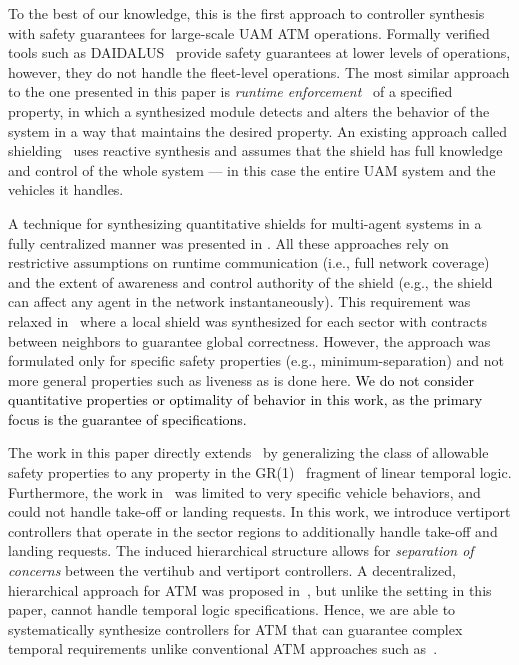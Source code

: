 To the best of our knowledge, this is the first approach to
controller synthesis with safety guarantees for large-scale UAM ATM operations. Formally verified tools such as DAIDALUS~\cite{Daidalus} provide safety guarantees at lower levels of operations, however, they do not handle the fleet-level operations. The most similar approach to the one presented in this paper is \emph{runtime enforcement}~\cite{Falcone10,Schneider00} of a specified property, in which a synthesized module detects and alters the behavior of the system in a way that maintains the desired property. An existing approach called shielding~\cite{BloemKKW15,KonighoferABHKT17} uses reactive synthesis and assumes that the shield has full knowledge and control of the whole system --- in this case the entire UAM system and the vehicles it handles. 

A technique for synthesizing quantitative shields for multi-agent systems in a fully centralized manner was presented in \cite{multiagentshield}. All these approaches rely on restrictive assumptions on runtime communication (i.e., full network coverage) and the extent of awareness and control authority of the shield (e.g., the shield can affect any agent in the network instantaneously). This requirement was relaxed in~\cite{bhnfm} where a local shield was synthesized for each sector with contracts between neighbors to guarantee global correctness. However, the approach was formulated only for specific safety properties (e.g., minimum-separation) and not more general properties such as liveness as is done here. \textcolor{black}{We do not consider quantitative properties or optimality of behavior in this work, as the primary focus is the guarantee of specifications.}

The work in this paper directly extends~\cite{bhnfm} by generalizing the class of allowable safety properties to any property in the GR(1)~\cite{bloem2012synthesis} fragment of linear temporal logic. Furthermore, the work in~\cite{bhnfm} was limited to very specific vehicle behaviors, and could not handle take-off or landing requests. In this work, we introduce vertiport controllers that operate in the sector regions to additionally handle take-off and landing requests. The induced hierarchical structure allows for \emph{separation of concerns} between the vertihub and vertiport controllers. A decentralized, hierarchical approach for ATM was proposed in~\cite{6011668}, but unlike the setting in this paper, cannot handle temporal logic specifications. Hence, we are able to systematically synthesize controllers for ATM that can guarantee complex temporal requirements unlike conventional ATM approaches such as~\cite{6011668}. 

